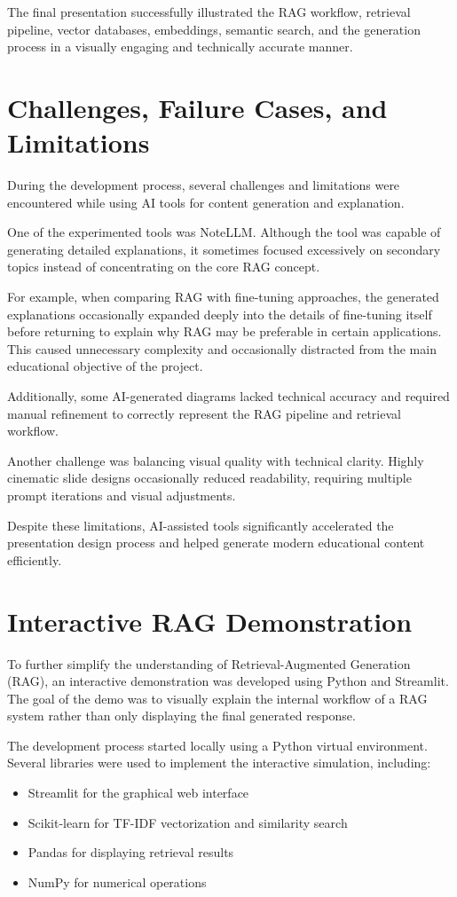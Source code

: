 \documentclass[12pt,a4paper]{article}
\begin{document}
The final presentation successfully illustrated the RAG workflow, retrieval pipeline, vector databases, embeddings, semantic search, and the generation process in a visually engaging and technically accurate manner.

\section{Challenges, Failure Cases, and Limitations}

During the development process, several challenges and limitations were encountered while using AI tools for content generation and explanation.

One of the experimented tools was NoteLLM. Although the tool was capable of generating detailed explanations, it sometimes focused excessively on secondary topics instead of concentrating on the core RAG concept.

For example, when comparing RAG with fine-tuning approaches, the generated explanations occasionally expanded deeply into the details of fine-tuning itself before returning to explain why RAG may be preferable in certain applications. This caused unnecessary complexity and occasionally distracted from the main educational objective of the project.

Additionally, some AI-generated diagrams lacked technical accuracy and required manual refinement to correctly represent the RAG pipeline and retrieval workflow.

Another challenge was balancing visual quality with technical clarity. Highly cinematic slide designs occasionally reduced readability, requiring multiple prompt iterations and visual adjustments.

Despite these limitations, AI-assisted tools significantly accelerated the presentation design process and helped generate modern educational content efficiently.

\section{Interactive RAG Demonstration}

To further simplify the understanding of Retrieval-Augmented Generation (RAG), an interactive demonstration was developed using Python and Streamlit. The goal of the demo was to visually explain the internal workflow of a RAG system rather than only displaying the final generated response.

The development process started locally using a Python virtual environment. Several libraries were used to implement the interactive simulation, including:
\begin{itemize}
    \item Streamlit for the graphical web interface
    \item Scikit-learn for TF-IDF vectorization and similarity search
    \item Pandas for displaying retrieval results
    \item NumPy for numerical operations
\end{itemize}
\end{document}
